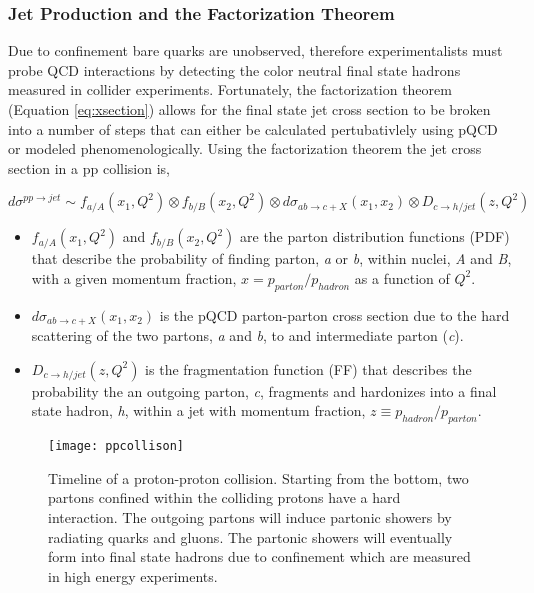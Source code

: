 \subsubsection{Jet Production and the Factorization Theorem}\label{sec:fac}

Due to confinement bare quarks are unobserved, therefore experimentalists must probe QCD interactions by detecting the color neutral final state hadrons measured in collider experiments.  Fortunately, the factorization theorem (Equation \ref{eq:xsection}) allows for the final state jet cross section to be broken into a number of steps that can either be calculated pertubativlely using pQCD or modeled phenomenologically.  Using the factorization theorem the jet cross section in a pp collision is,


\begin{equation}
d\sigma^{pp \rightarrow jet} \sim f_{a/A}(x_{1},Q^{2}) \otimes  f_{b/B}(x_{2},Q^{2}) \otimes d\sigma_{ab \rightarrow c + X} (x_{1},x_{2}) \otimes D_{c \rightarrow h/jet}(z,Q^{2})
\label{eq:xsection}
\end{equation}

\noindent
\begin{itemize}
\item  $ f_{a/A}(x_{1},Q^{2})$ and $ f_{b/B}(x_{2},Q^{2})$ are the parton distribution functions (PDF) that describe the probability of finding parton, \textit{a} or \textit{b}, within nuclei, \textit{A} and \textit{B}, with a given momentum fraction, $x = p_{parton} / p_{hadron} $ as a function of $Q^{2}$.
\item  $d\sigma_{ab \rightarrow c + X} (x_{1},x_{2})$ is the pQCD parton-parton cross section due to the hard scattering of the two partons, \textit{a} and \textit{b}, to and intermediate parton (\textit{c}).
\item   $ D_{c \rightarrow h/jet}(z,Q^{2})$ is the fragmentation function (FF) that describes the probability the an outgoing parton, \textit{c}, fragments and hardonizes into a final state hadron, \textit{h}, within a jet with momentum fraction, $z \equiv p_{hadron} / p_{parton}$.
\end{itemize}

\begin{figure}[h]
\texttt{[image: ppcollison]}
\centering
\caption{Timeline of a proton-proton collision.  Starting from the bottom, two partons confined within the colliding protons have a hard interaction.  The outgoing partons will induce partonic showers by radiating quarks and gluons.  The partonic showers will eventually form into final state hadrons due to confinement which are measured in high energy experiments\cite{Dobbs:2001ck}.}
\label{fig:FactorizationCartoon}
\end{figure}


